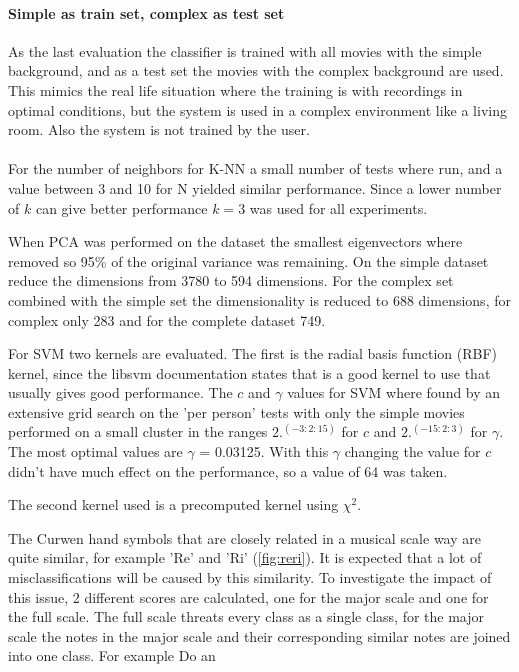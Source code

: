\paragraph{Simple as train set, complex as test set}
As the last evaluation the classifier is trained with all movies with the simple background, and as a test set the movies with the complex background are used. This mimics the real life situation where the training is with recordings in optimal conditions, but the system is used in a complex environment like a living room. Also the system is not trained by the user.

\paragraph{}
For the number of neighbors for K-NN a small number of tests where run, and a value between 3 and 10 for N yielded similar performance. Since a lower number of $k$ can give better performance $k=3$ was used for all experiments.

When PCA was performed on the dataset the smallest eigenvectors where removed so 95\% of the original variance was remaining. On the simple dataset reduce the dimensions from 3780 to 594 dimensions. For the complex set combined with the simple set the dimensionality is reduced to 688 dimensions, for complex only 283 and for the complete dataset 749.

For SVM two kernels are evaluated. The first is the radial basis function (RBF) kernel, since the libsvm documentation states that is a good kernel to use that usually gives good performance. The $c$ and $\gamma$ values for SVM where found by an extensive grid search on the 'per person' tests with only the simple movies performed on a small cluster in the ranges $2.^(-3:2:15)$ for $c$ and $2.^(-15:2:3)$ for $\gamma$. The most optimal values are $\gamma$ = 0.03125. With this $\gamma$ changing the value for $c$ didn't have much effect on the performance, so a value of 64 was taken.

The second kernel used is a precomputed kernel using $\chi^2$.

The Curwen hand symbols that are closely related in a musical scale way are quite similar, for example 'Re' and 'Ri' (\autoref{fig:reri}). It is expected that a lot of misclassifications will be caused by this similarity. To investigate the impact of this issue, 2 different scores are calculated, one for the major scale and one for the full scale. The full scale threats every class as a single class, for the major scale the notes in the major scale and their corresponding similar notes are joined into one class. For example Do an

